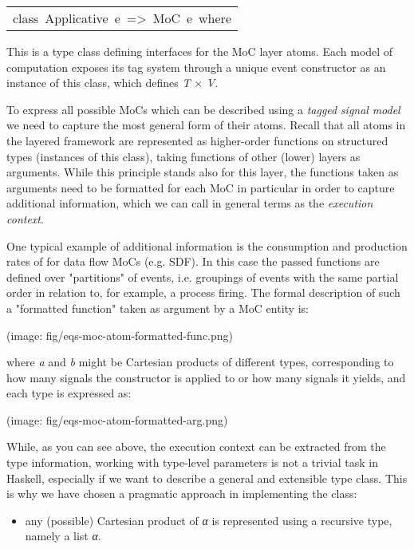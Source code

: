 \begin{haddockdesc}
\item[\begin{tabular}{@{}l}
class\ Applicative\ e\ =>\ MoC\ e\ where
\end{tabular}]\haddockbegindoc
This is a type class defining interfaces for the MoC layer
 atoms. Each model of computation exposes its tag system through a
 unique event constructor as an instance of this class, which
 defines \emph{T} × \emph{V}.\par
 To express all possible MoCs which can be described using
 a \emph{tagged} \emph{signal} \emph{model} we need to capture the most general
 form of their atoms. Recall that all atoms in the layered framework
 are represented as higher-order functions on structured types
 (instances of this class), taking functions of other (lower) layers
 as arguments. While this principle stands also for this layer, the
 functions taken as arguments need to be formatted for each MoC in
 particular in order to capture additional information, which we can
 call in general terms as the \emph{execution context}.\par
One typical example of additional information is the consumption
 and production rates of for data flow MoCs (e.g. SDF). In this case
 the passed functions are defined over "partitions" of events,
 i.e. groupings of events with the same partial order in relation
 to, for example, a process firing. The formal description of such a
 "formatted function" taken as argument by a MoC entity is:\par
(image: fig/eqs-moc-atom-formatted-func.png)\par
where \emph{a} and \emph{b} might be Cartesian products of different types,
 corresponding to how many signals the constructor is applied to or
 how many signals it yields, and each type is expressed as:\par
(image: fig/eqs-moc-atom-formatted-arg.png)\par
While, as you can see above, the execution context can be extracted
 from the type information, working with type-level parameters is
 not a trivial task in Haskell, especially if we want to describe a
 general and extensible type class. This is why we have chosen a
 pragmatic approach in implementing the  class:\par
\begin{itemize}
\item
any (possible) Cartesian product of \emph{α} is represented using
 a recursive type, namely a list {}\emph{α}{}.\par


\end{itemize}
\end{haddockdesc}
